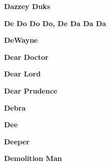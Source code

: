 \begin{center}\textbf{Dazzey Duks}\end{center}
\newline
\vspace{10pt} 
\begin{center}\textbf{De Do Do Do, De Da Da Da}\end{center}
\newline
\vspace{10pt} 
\begin{center}\textbf{DeWayne}\end{center}
\newline
\vspace{10pt} 
\begin{center}\textbf{Dear Doctor}\end{center}
\newline
\vspace{10pt} 
\begin{center}\textbf{Dear Lord}\end{center}
\newline
\vspace{10pt} 
\begin{center}\textbf{Dear Prudence}\end{center}
\newline
\vspace{10pt} 
\begin{center}\textbf{Debra}\end{center}
\newline
\vspace{10pt} 
\begin{center}\textbf{Dee}\end{center}
\newline
\vspace{10pt} 
\begin{center}\textbf{Deeper}\end{center}
\newline
\vspace{10pt} 
\begin{center}\textbf{Demolition Man}\end{center}
\newline
